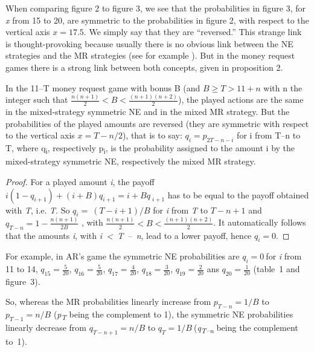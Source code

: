 \begin{Article}
\begin{refsection}[Umbhauer]
When comparing figure 2 to figure 3, we see that the probabilities in
figure 3, for \emph{x} from 15 to 20, are symmetric to the probabilities
in figure 2, with respect to the vertical axis \(x = 17.5\). We simply
say that they are ``reversed.'' This strange link is thought-provoking
because usually there is no obvious link between the NE strategies and
the MR strategies (see for example \textcite{umbhauer2022}). But in the
money request games there is a strong link between both concepts, given
in proposition 2.


\begin{proposition}
In the 11--T money request game with bonus B (and \(B \geq T > 11 + n\) with n the integer such that \(\frac{n(n + 1)}{2} < B < \frac{(n + 1)(n + 2)}{2}\)), the played actions are the same in the mixed-strategy symmetric NE and in the mixed
MR strategy. But the probabilities of the played amounts are reversed
(they are symmetric with respect to the vertical axis
\(x = T - n/2\)), that is to say: \(q_{i} = p_{2T - n - i}\)
for i from T--n to T, where q\textsubscript{i}, respectively
p\textsubscript{i}, is the probability assigned to the amount i by the
mixed-strategy symmetric NE, respectively the mixed MR strategy.
\end{proposition}

\begin{proof}
For a played amount \emph{i}, the payoff
\(i(1 - q_{i + 1}) + (i + B)q_{i + 1} = i + B{q\ }_{i + 1}\) has to be
equal to the payoff obtained with \emph{T}, i.e. \emph{T}. So
\(q_{i} = \ (T - i + 1)/B\) for \emph{i} from \emph{T} to \(T - n + 1\)
and \(q_{T - n} = 1 - \frac{n(n + 1)}{2B}\) , with
\(\frac{n(n + 1)}{2} < B < \frac{(n + 1)(n + 2)}{2}\). It automatically
follows that the amounts \emph{i}, with \emph{i~\textless~T~--~n}, lead
to a lower payoff, hence \(q_{i} = 0\). \quad \blacksquare
\end{proof} 

\vspace{0.5cm}
For example, in AR's game the symmetric NE probabilities are
\(q_{i} = 0\ \)for \emph{i} from 11 to 14, $q_{15} = \frac{5}{20}$, $q_{16} = \frac{5}{20}$, $q_{17} = \frac{4}{20}$, $q_{18} = \frac{3}{20}$, $q_{19} = \frac{2}{20}$ ans $q_{20} = \frac{1}{20}$ (table~1 and figure~3).

So, whereas the MR probabilities linearly increase from
\(p_{T - n} = 1/B\) to \(p_{T - 1} = n/B\) (\emph{p\textsubscript{T}}
being the complement to 1), the symmetric NE probabilities linearly
decrease from \(q_{T - n + 1} = n/B\) to \(q_{T} = 1/B\ \)(\emph{q\textsubscript{T--n}} being the complement to~1).


\end{refsection}
\end{Article}
